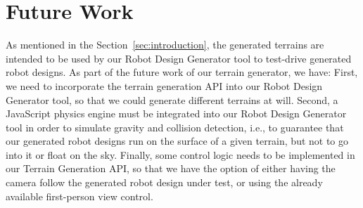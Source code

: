 \section{Future Work} 
\label{sec:future_work}

As mentioned in the Section~\ref{sec:introduction}, the generated terrains are intended to be used by our Robot Design Generator tool to test-drive generated robot designs. As part of the future work of our terrain generator, we have: First, we need to incorporate the terrain generation API into our Robot Design Generator tool, so that we could generate different terrains at will. Second, a JavaScript physics engine must be integrated into our Robot Design Generator tool in order to simulate gravity and collision detection, i.e., to guarantee that our generated robot designs run on the surface of a given terrain, but not to go into it or float on the sky. Finally, some control logic needs to be implemented in our Terrain Generation API, so that we have the option of either having the camera follow the generated robot design under test, or using the already available first-person view control.

